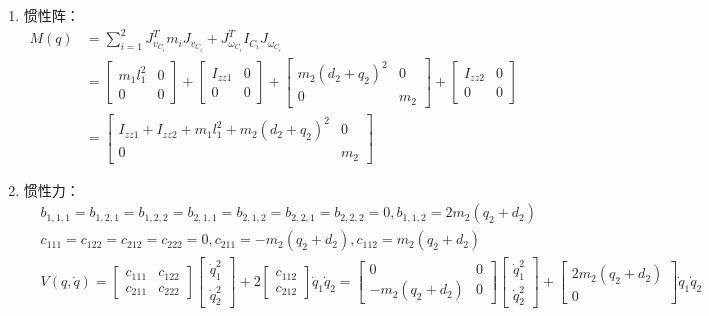 \documentclass[
12pt, %
a4paper, 
oneside, %
headinclude,footinclude, %
]{scrartcl}
\begin{document}
{\begin{enumerate}
\begin{align*}
\end{align*}
\item 惯性阵：
\begin{align*}
M(q) &= \sum_{i = 1}^{2} J_{v_{C_i}}^T m_i J_{v_{C_i}} + J_{\omega_{C_i}}^T I_{C_i} J_{\omega_{C_i}} \\
&= \begin{bmatrix} m_1 l_1^2 & 0 \\ 0 & 0 \end{bmatrix} + \begin{bmatrix} I_{zz1} & 0 \\ 0 & 0 \end{bmatrix} + \begin{bmatrix} m_2(d_2 + q_2)^2 & 0 \\ 0 & m_2 \end{bmatrix} + \begin{bmatrix} I_{zz2} & 0 \\ 0 & 0 \end{bmatrix} \\
&= \begin{bmatrix} I_{zz1} + I_{zz2} + m_1 l_1^2 + m_2(d_2 + q_2)^2 & 0 \\ 0 & m_2 \end{bmatrix}
\end{align*}
\item 惯性力：
\begin{align*}
&b_{1,1,1} = b_{1,2,1} = b_{1,2,2} = b_{2,1,1} = b_{2,1,2} = b_{2,2,1} = b_{2,2,2} = 0, b_{1,1,2} = 2m_2(q_2 + d_2) \\
&c_{111} = c_{122} = c_{212} = c_{222} = 0, c_{211} = -m_2(q_2 + d_2), c_{112} = m_2(q_2 + d_2) \\
&V(q, \dot{q}) = \begin{bmatrix} c_{111} & c_{122} \\ c_{211} & c_{222} \end{bmatrix} \begin{bmatrix} \dot{q}_1^2 \\ \dot{q}_2^2 \end{bmatrix} + 2\begin{bmatrix} c_{112} \\ c_{212} \end{bmatrix} \dot{q}_1 \dot{q}_2 = \begin{bmatrix} 0 & 0 \\ -m_2(q_2 + d_2) & 0 \end{bmatrix} \begin{bmatrix} \dot{q}_1^2 \\ \dot{q}_2^2 \end{bmatrix} + \begin{bmatrix} 2m_2(q_2 + d_2) \\ 0 \end{bmatrix} \dot{q}_1 \dot{q}_2

\end{align*}
\end{enumerate}}
\end{document}
